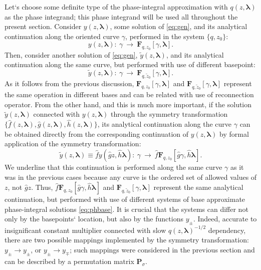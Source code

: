 \documentclass[atmp]{ipart_v1}
\def\lmbd{\bm{\lambda}}
\def\f{\hat{f}}
\def\g{\hat{g}}
\def\h{\hat{h}}
\def\P{\bm{P}_\sigma}
\def\F{\bm{F}}
\newcommand\eref[1]{\eqref{#1}}
\newcommand\predexp[1][z]{q(#1,\lmbd)^{-1/2}}
\begin{document}
Let`s choose some definite type of the phase-integral approximation with $q(z,\lmbd)$ 
as the phase integrand; this phase integrand will be used all throughout the present section. 
Consider $y(z,\lmbd)$, some solution of \eref{eq:gen}, and its analytical continuation
along the oriented curve $\gamma$, performed in the system $\{q,z_0\}$:
\begin{equation}
y(z,\lmbd):\ \gamma\ \longrightarrow\ \F_{q,z_0}[\gamma,\lmbd]. 
\end{equation}
Then, consider another solution of \eref{eq:gen}, $\tilde{y}(z,\lmbd)$, and its
analytical continuation along the same curve, but performed with use of different basepoint:
\begin{equation}
\tilde{y}(z,\lmbd):\ \gamma\ \longrightarrow\ \F_{q,\tilde{z}_0}[\gamma,\lmbd]. 
\end{equation}
As it follows from the previous discussion, $\F_{q,z_0}[\gamma,\lmbd]$ and 
$\F_{q,\tilde{z}_0}[\gamma,\lmbd]$ represent the same operation in different bases and
can be related with use of reconnection operator. From the other hand, and this is much more important, 
if the solution $\tilde{y}(z,\lmbd)$ connected with $y(z,\lmbd)$ through
the symmetry transformation $\{\f(z,\lmbd),\g(z,\lmbd),\h(z,\lmbd)\}$, its analytical continuation
along the curve $\gamma$ can be obtained directly from the 
corresponding continuation of $y(z,\lmbd)$ by formal application of the symmetry transformation:
\begin{equation}
\tilde{y}(z,\lmbd) \equiv \f y(\g z,\h \lmbd):\ 
\gamma\ \longrightarrow\ \f\F_{q,z_0}[\g\gamma,\h\lmbd]. 
\end{equation}
We underline that this continuation is performed along the same curve $\gamma$ as it was in 
the previous cases because any curve is the ordered set of allowed values of $z$, not $\g z$. Thus, 
$\f\F_{q,z_0}[\g\gamma,\h\lmbd]$ and $\F_{q,\tilde{z}_0}[\gamma,\lmbd]$ represent the 
same analytical continuation, but performed with use of different systems of base approximate phase-integral 
solutions \eref{eq:phbase}. It is crucial that the systems can differ not only by the basepoints` location,
but also by the functions $y_\pm$. Indeed, accurate to insignificant constant multiplier connected with slow
$\predexp$ dependency, there are two possible mappings implemented by the symmetry transformation: 
$y_\pm \rightarrow y_\pm$, or $y_\pm \rightarrow y_\mp$; such mappings were considered in the previous section 
and can be described by a permutation matrix $\P$.
 
\end{document}
